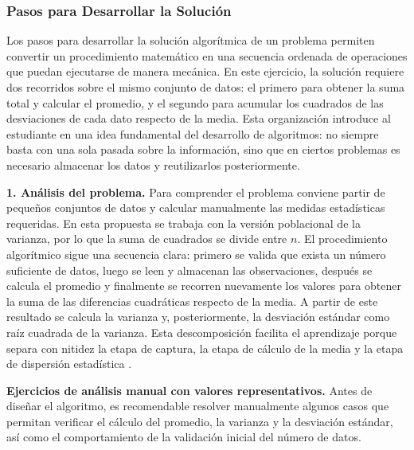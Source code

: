 \documentclass[12pt,twoside]{book}
\begin{document}
				\subsubsection{Pasos para Desarrollar la Solución}
					\noindent
					Los pasos para desarrollar la solución algorítmica de un problema permiten convertir un procedimiento matemático en una secuencia ordenada de operaciones que puedan ejecutarse de manera mecánica. En este ejercicio, la solución requiere dos recorridos sobre el mismo conjunto de datos: el primero para obtener la suma total y calcular el promedio, y el segundo para acumular los cuadrados de las desviaciones de cada dato respecto de la media. Esta organización introduce al estudiante en una idea fundamental del desarrollo de algoritmos: no siempre basta con una sola pasada sobre la información, sino que en ciertos problemas es necesario almacenar los datos y reutilizarlos posteriormente.
					
					\noindent
					\textbf{1. Análisis del problema.}  
					Para comprender el problema conviene partir de pequeños conjuntos de datos y calcular manualmente las medidas estadísticas requeridas. En esta propuesta se trabaja con la versión poblacional de la varianza, por lo que la suma de cuadrados se divide entre \(n\). El procedimiento algorítmico sigue una secuencia clara: primero se valida que exista un número suficiente de datos, luego se leen y almacenan las observaciones, después se calcula el promedio y finalmente se recorren nuevamente los valores para obtener la suma de las diferencias cuadráticas respecto de la media. A partir de este resultado se calcula la varianza y, posteriormente, la desviación estándar como raíz cuadrada de la varianza. Esta descomposición facilita el aprendizaje porque separa con nitidez la etapa de captura, la etapa de cálculo de la media y la etapa de dispersión estadística \cite{Cormen2022Introduction,Sebesta2018Concepts,Qian2018Students}.
					
					\noindent
					\textbf{Ejercicios de análisis manual con valores representativos.}
					Antes de diseñar el algoritmo, es recomendable resolver manualmente algunos casos que permitan verificar el cálculo del promedio, la varianza y la desviación estándar, así como el comportamiento de la validación inicial del número de datos.
					
\end{document}
